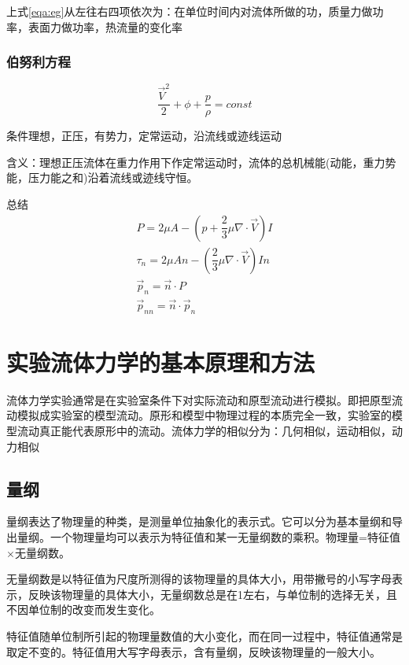 \documentclass[a4paper,oneside]{ctexbook}
\begin{document}
上式\ref{eqa:eg}从左往右四项依次为：在单位时间内对流体所做的功，质量力做功率，表面力做功率，热流量的变化率

\subsection{伯努利方程}
\begin{equation}
    \dfrac{\overrightarrow{V}^2}{2}+\phi+\dfrac{p}{\rho}=const
\end{equation}

条件理想，正压，有势力，定常运动，沿流线或迹线运动

含义：理想正压流体在重力作用下作定常运动时，流体的总机械能(动能，重力势能，压力能之和)沿着流线或迹线守恒。

总结
\begin{gather}
    P=2\mu{A}-\left(p+\dfrac{2}{3}\mu\nabla\cdot\overrightarrow{V}\right)I\\
    \tau_n=2\mu{A}n-\left(\dfrac{2}{3}\mu\nabla\cdot\overrightarrow{V}\right)In\\
    \overrightarrow{p}_n=\overrightarrow{n}\cdot{P}\\
    \overrightarrow{p}_{nn}=\overrightarrow{n}\cdot\overrightarrow{p}_n
\end{gather}

\chapter{实验流体力学的基本原理和方法}

流体力学实验通常是在实验室条件下对实际流动和原型流动进行模拟。即把原型流动模拟成实验室的模型流动。原形和模型中物理过程的本质完全一致，实验室的模型流动真正能代表原形中的流动。流体力学的相似分为：几何相似，运动相似，动力相似

\section{量纲}

量纲表达了物理量的种类，是测量单位抽象化的表示式。它可以分为基本量纲和导出量纲。一个物理量均可以表示为特征值和某一无量纲数的乘积。物理量=特征值\(\times\)无量纲数。

无量纲数是以特征值为尺度所测得的该物理量的具体大小，用带撇号的小写字母表示，反映该物理量的具体大小，无量纲数总是在1左右，与单位制的选择无关，且不因单位制的改变而发生变化。

特征值随单位制所引起的物理量数值的大小变化，而在同一过程中，特征值通常是取定不变的。特征值用大写字母表示，含有量纲，反映该物理量的一般大小。
\end{document}
